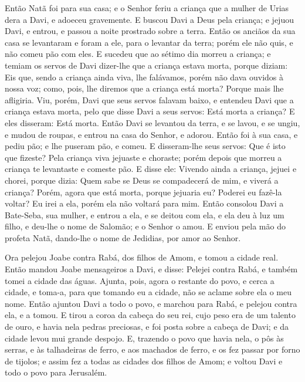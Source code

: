 Então Natã foi para sua casa; e o Senhor feriu a criança que a
mulher de Urias dera a Davi, e adoeceu gravemente. E buscou
Davi a Deus pela criança; e jejuou Davi, e entrou, e passou a noite
prostrado sobre a terra. Então os anciãos da sua casa se
levantaram e foram a ele, para o levantar da terra; porém ele não
quis, e não comeu pão com eles. E sucedeu que ao sétimo dia
morreu a criança; e temiam os servos de Davi dizer-lhe que a criança
estava morta, porque diziam: Eis que, sendo a criança ainda viva,
lhe falávamos, porém não dava ouvidos à nossa voz; como, pois, lhe
diremos que a criança está morta? Porque mais lhe afligiria.
Viu, porém, Davi que seus servos falavam baixo, e entendeu
Davi que a criança estava morta, pelo que disse Davi a seus servos:
Está morta a criança? E eles disseram: Está morta. Então Davi
se levantou da terra, e se lavou, e se ungiu, e mudou de roupas, e
entrou na casa do Senhor, e adorou. Então foi à sua casa, e pediu
pão; e lhe puseram pão, e comeu. E disseram-lhe seus servos:
Que é isto que fizeste? Pela criança viva jejuaste e choraste; porém
depois que morreu a criança te levantaste e comeste pão. E
disse ele: Vivendo ainda a criança, jejuei e chorei, porque dizia:
Quem sabe se Deus se compadecerá de mim, e viverá a criança?
Porém, agora que está morta, porque jejuaria eu? Poderei eu
fazê-la voltar? Eu irei a ela, porém ela não voltará para mim.
Então consolou Davi a Bate-Seba, sua mulher, e entrou a ela,
e se deitou com ela, e ela deu à luz um filho, e deu-lhe o nome de
Salomão; e o Senhor o amou. E enviou pela mão do profeta
Natã, dando-lhe o nome de Jedidias, por amor ao Senhor.

Ora pelejou Joabe contra Rabá, dos filhos de Amom, e tomou a
cidade real. Então mandou Joabe mensageiros a Davi, e disse:
Pelejei contra Rabá, e também tomei a cidade das águas.
Ajunta, pois, agora o restante do povo, e cerca a cidade, e
toma-a, para que tomando eu a cidade, não se aclame sobre ela o meu
nome. Então ajuntou Davi a todo o povo, e marchou para Rabá,
e pelejou contra ela, e a tomou. E tirou a coroa da cabeça do
seu rei, cujo peso era de um talento de ouro, e havia nela pedras
preciosas, e foi posta sobre a cabeça de Davi; e da cidade levou mui
grande despojo. E, trazendo o povo que havia nela, o pôs às
serras, e às talhadeiras de ferro, e aos machados de ferro, e os fez
passar por forno de tijolos; e assim fez a todas as cidades dos
filhos de Amom; e voltou Davi e todo o povo para Jerusalém.

\medskip

